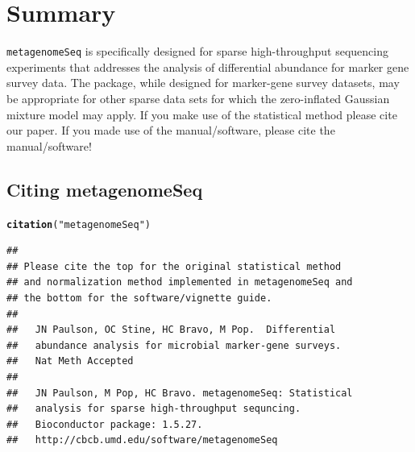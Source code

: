 \documentclass[a4paper,11pt]{article}\usepackage[]{graphicx}\usepackage[]{color}
\makeatletter
\newcommand{\hlstr}[1]{\textcolor[rgb]{0.192,0.494,0.8}{#1}}%
\newcommand{\hlstd}[1]{\textcolor[rgb]{0.345,0.345,0.345}{#1}}%
\newcommand{\hlkwd}[1]{\textcolor[rgb]{0.737,0.353,0.396}{\textbf{#1}}}%
\newenvironment{kframe}{%
 \def\at@end@of@kframe{}%
 \ifinner\ifhmode%
  \def\at@end@of@kframe{\end{minipage}}%
  \begin{minipage}{\columnwidth}%
 \fi\fi%
 \def\FrameCommand##1{\hskip\@totalleftmargin \hskip-\fboxsep
 \colorbox{shadecolor}{##1}\hskip-\fboxsep
     \hskip-\linewidth \hskip-\@totalleftmargin \hskip\columnwidth}%
 \MakeFramed {\advance\hsize-\width
   \@totalleftmargin\z@ \linewidth\hsize
   \@setminipage}}%
 {\par\unskip\endMakeFramed%
 \at@end@of@kframe}
\newenvironment{knitrout}{}{} %
\makeatother
\begin{document}
\newpage
\section{Summary}

\texttt{metagenomeSeq} is specifically designed for sparse high-throughput sequencing experiments that addresses the analysis of differential abundance for marker gene survey data. The package, while designed for marker-gene survey datasets, may be appropriate for other sparse data sets for which the zero-inflated Gaussian mixture model may apply. If you make use of the statistical method please cite our paper. If you made use of the manual/software, please cite the manual/software!

\subsection{Citing metagenomeSeq}
\begin{knitrout}
\color{fgcolor}\begin{kframe}
\begin{alltt}
\hlkwd{citation}\hlstd{(}\hlstr{"metagenomeSeq"}\hlstd{)}
\end{alltt}
\begin{verbatim}
## 
## Please cite the top for the original statistical method
## and normalization method implemented in metagenomeSeq and
## the bottom for the software/vignette guide.
## 
##   JN Paulson, OC Stine, HC Bravo, M Pop.  Differential
##   abundance analysis for microbial marker-gene surveys.
##   Nat Meth Accepted
## 
##   JN Paulson, M Pop, HC Bravo. metagenomeSeq: Statistical
##   analysis for sparse high-throughput sequncing.
##   Bioconductor package: 1.5.27.
##   http://cbcb.umd.edu/software/metagenomeSeq
\end{verbatim}
\end{kframe}
\end{knitrout}
\end{document}
